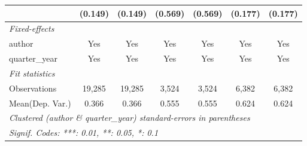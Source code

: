 \begin{tabular}{lcccccc}
                                         & (0.149)       & (0.149)       & (0.569)       & (0.569)       & (0.177)       & (0.177)\\   
   \midrule
   \emph{Fixed-effects}\\
   author                                & Yes           & Yes           & Yes           & Yes           & Yes           & Yes\\  
   quarter\_year                         & Yes           & Yes           & Yes           & Yes           & Yes           & Yes\\  
   \midrule
   \emph{Fit statistics}\\
   Observations                          & 19,285        & 19,285        & 3,524         & 3,524         & 6,382         & 6,382\\  
Mean(Dep. Var.) & 0.366 & 0.366 & 0.555 & 0.555 & 0.624 & 0.624 \\
   \midrule \midrule
   \multicolumn{7}{l}{\emph{Clustered (author \& quarter\_year) standard-errors in parentheses}}\\
   \multicolumn{7}{l}{\emph{Signif. Codes: ***: 0.01, **: 0.05, *: 0.1}}\\
\end{tabular}
\par\endgroup
